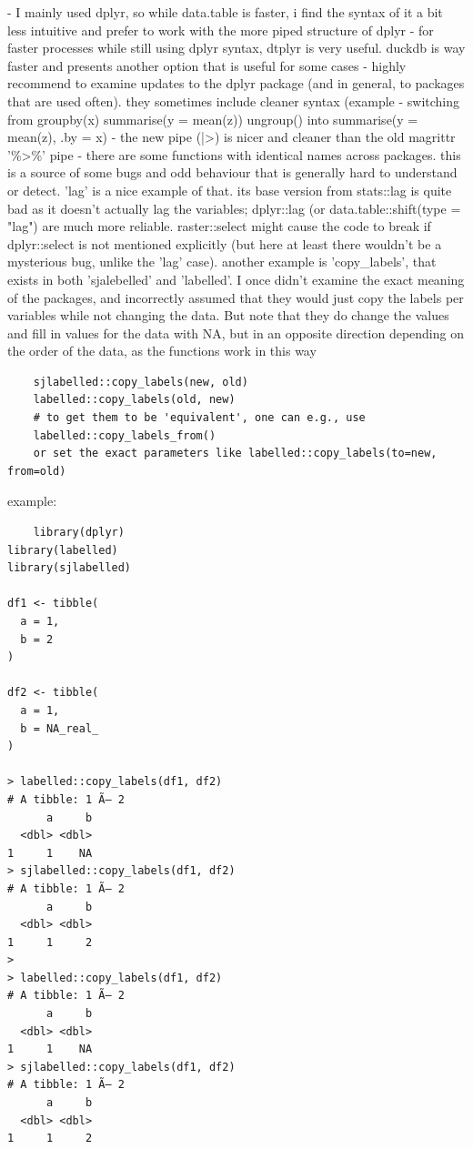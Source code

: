 - I mainly used dplyr, so while data.table is faster, i find the syntax of it a bit less intuitive and prefer to work with the more piped structure of dplyr
- for faster processes while still using dplyr syntax, dtplyr is very useful. duckdb is way faster and presents another option that is useful for some cases
- highly recommend to examine updates to the dplyr package (and in general, to packages that are used often). they sometimes include cleaner syntax (example - switching from groupby(x) summarise(y = mean(z)) ungroup() into summarise(y = mean(z), .by = x)
- the new pipe (|>) is nicer and cleaner than the old magrittr '\%>\%' pipe
- there are some functions with identical names across packages. this is a source of some bugs and odd behaviour that is generally hard to understand or detect. 'lag' is a nice example of that. its base version from stats::lag is quite bad as it doesn't actually lag the variables; dplyr::lag (or data.table::shift(type = "lag") are much more reliable. raster::select might cause the code to break if dplyr::select is not mentioned explicitly (but here at least there wouldn't be a mysterious bug, unlike the 'lag' case). another example is 'copy\_labels', that exists in both 'sjalebelled' and 'labelled'. I once didn't examine the exact meaning of the packages, and incorrectly assumed that they would just copy the labels per variables while not changing the data.
But note that they do change the values and fill in values for the data with NA, but in an opposite direction depending on the order of the data, as the functions work in this way
\begin{verbatim}
    sjlabelled::copy_labels(new, old)
    labelled::copy_labels(old, new)
    # to get them to be 'equivalent', one can e.g., use
    labelled::copy_labels_from()
    or set the exact parameters like labelled::copy_labels(to=new, from=old) 
\end{verbatim}
example:
\begin{verbatim}
    library(dplyr)
library(labelled)
library(sjlabelled)

df1 <- tibble(
  a = 1,
  b = 2
) 

df2 <- tibble(
  a = 1,
  b = NA_real_
)

> labelled::copy_labels(df1, df2)
# A tibble: 1 Ã— 2
      a     b
  <dbl> <dbl>
1     1    NA
> sjlabelled::copy_labels(df1, df2)
# A tibble: 1 Ã— 2
      a     b
  <dbl> <dbl>
1     1     2
> 
> labelled::copy_labels(df1, df2)
# A tibble: 1 Ã— 2
      a     b
  <dbl> <dbl>
1     1    NA
> sjlabelled::copy_labels(df1, df2)
# A tibble: 1 Ã— 2
      a     b
  <dbl> <dbl>
1     1     2

\end{verbatim}

